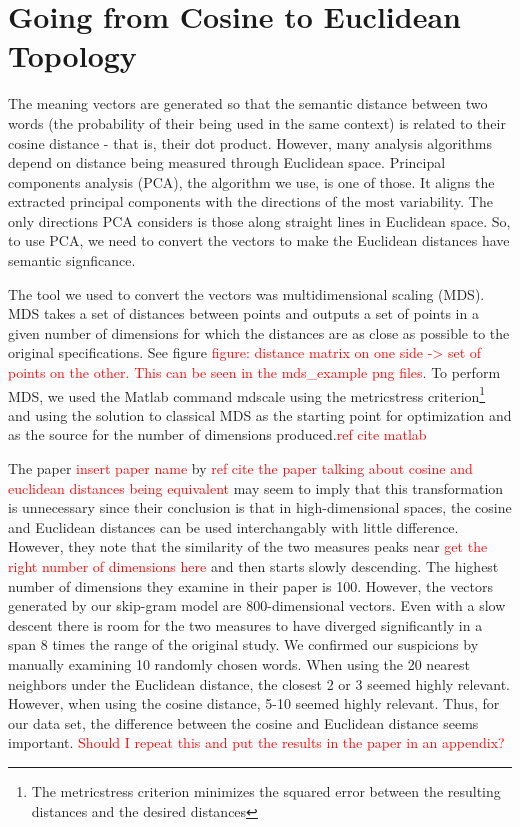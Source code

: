 \documentclass[10pt,letterpaper]{book}
\newcommand{\todo}[1]{\textcolor{red}{#1}}
\begin{document}
\section{Going from Cosine to Euclidean Topology}

The meaning vectors are generated so that the semantic distance between two words (the probability of their being used in the same context) is related to their cosine distance - that is, their dot product. However, many analysis algorithms depend on distance being measured through Euclidean space. Principal components analysis (PCA), the algorithm we use, is one of those. It aligns the extracted principal components with the directions of the most variability. The only directions PCA considers is those along straight lines in Euclidean space. So, to use PCA, we need to convert the vectors to make the Euclidean distances have semantic signficance. 

The tool we used to convert the vectors was multidimensional scaling (MDS). MDS takes a set of distances between points and outputs a set of points in a given number of dimensions for which the distances are as close as possible to the original specifications. See figure \todo{figure: distance matrix on one side -> set of points on the other. This can be seen in the mds\_example png files}. To perform MDS, we used the Matlab command mdscale using the metricstress criterion\footnote{The metricstress criterion minimizes the squared error between the resulting distances and the desired distances} and using the solution to classical MDS as the starting point for optimization and as the source for the number of dimensions produced.\todo{ref cite matlab}

The paper \todo{insert paper name} by \todo{ref cite the paper talking about cosine and euclidean distances being equivalent} may seem to imply that this transformation is unnecessary since their conclusion is that in high-dimensional spaces, the cosine and Euclidean distances can be used interchangably with little difference. However, they note that the similarity of the two measures peaks near \todo{get the right number of dimensions here} and then starts slowly descending. The highest number of dimensions they examine in their paper is 100. However, the vectors generated by our skip-gram model are 800-dimensional vectors. Even with a slow descent there is room for the two measures to have diverged significantly in a span 8 times the range of the original study. We confirmed our suspicions by manually examining 10 randomly chosen words. When using the 20 nearest neighbors under the Euclidean distance, the closest 2 or 3 seemed highly relevant. However, when using the cosine distance, 5-10 seemed highly relevant. Thus, for our data set, the difference between the cosine and Euclidean distance seems important. \todo{Should I repeat this and put the results in the paper in an appendix?}
\end{document}
